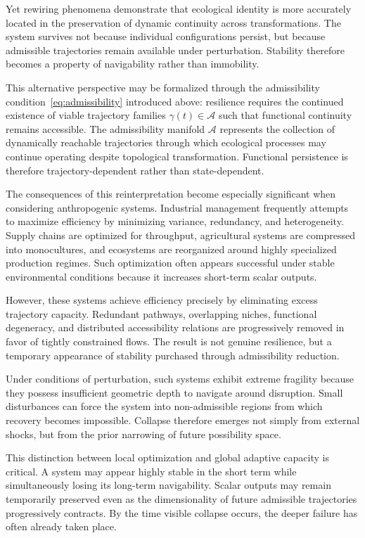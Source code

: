 \documentclass[11pt,a4paper]{article}
\newcommand{\Aspace}{\mathcal{A}}
\begin{document}
Yet rewiring phenomena demonstrate that ecological identity is more accurately located in the preservation of dynamic continuity across transformations. The system survives not because individual configurations persist, but because admissible trajectories remain available under perturbation. Stability therefore becomes a property of navigability rather than immobility.

This alternative perspective may be formalized through the admissibility condition~\eqref{eq:admissibility} introduced above: resilience requires the continued existence of viable trajectory families $\gamma(t) \in \Aspace$ such that functional continuity remains accessible. The admissibility manifold $\Aspace$ represents the collection of dynamically reachable trajectories through which ecological processes may continue operating despite topological transformation. Functional persistence is therefore trajectory-dependent rather than state-dependent.

The consequences of this reinterpretation become especially significant when considering anthropogenic systems. Industrial management frequently attempts to maximize efficiency by minimizing variance, redundancy, and heterogeneity. Supply chains are optimized for throughput, agricultural systems are compressed into monocultures, and ecosystems are reorganized around highly specialized production regimes. Such optimization often appears successful under stable environmental conditions because it increases short-term scalar outputs.

However, these systems achieve efficiency precisely by eliminating excess trajectory capacity. Redundant pathways, overlapping niches, functional degeneracy, and distributed accessibility relations are progressively removed in favor of tightly constrained flows. The result is not genuine resilience, but a temporary appearance of stability purchased through admissibility reduction.

Under conditions of perturbation, such systems exhibit extreme fragility because they possess insufficient geometric depth to navigate around disruption. Small disturbances can force the system into non-admissible regions from which recovery becomes impossible. Collapse therefore emerges not simply from external shocks, but from the prior narrowing of future possibility space.

This distinction between local optimization and global adaptive capacity is critical. A system may appear highly stable in the short term while simultaneously losing its long-term navigability. Scalar outputs may remain temporarily preserved even as the dimensionality of future admissible trajectories progressively contracts. By the time visible collapse occurs, the deeper failure has often already taken place.
\end{document}
